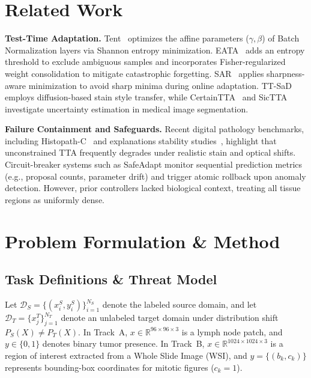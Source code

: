 \documentclass[conference]{IEEEtran}
\begin{document}
\section{Related Work}
\textbf{Test-Time Adaptation.} Tent~\cite{wang2021tent} optimizes the affine parameters ($\gamma, \beta$) of Batch Normalization layers via Shannon entropy minimization. EATA~\cite{niu2022eata} adds an entropy threshold to exclude ambiguous samples and incorporates Fisher-regularized weight consolidation to mitigate catastrophic forgetting. SAR~\cite{niu2023sar} applies sharpness-aware minimization to avoid sharp minima during online adaptation. TT-SaD~\cite{ttsad2024} employs diffusion-based stain style transfer, while CertainTTA~\cite{certaintta2025} and SicTTA~\cite{sictta2026} investigate uncertainty estimation in medical image segmentation.

\textbf{Failure Containment and Safeguards.} Recent digital pathology benchmarks, including Histopath-C~\cite{histopathc2026} and explanations stability studies~\cite{bahumanya2026explanationstability}, highlight that unconstrained TTA frequently degrades under realistic stain and optical shifts. Circuit-breaker systems such as SafeAdapt monitor sequential prediction metrics (e.g., proposal counts, parameter drift) and trigger atomic rollback upon anomaly detection. However, prior controllers lacked biological context, treating all tissue regions as uniformly dense.

\section{Problem Formulation \& Method}

\subsection{Task Definitions \& Threat Model}
Let $\mathcal{D}_S = \{(x_i^S, y_i^S)\}_{i=1}^{N_S}$ denote the labeled source domain, and let $\mathcal{D}_T = \{x_j^T\}_{j=1}^{N_T}$ denote an unlabeled target domain under distribution shift $P_S(X) \ne P_T(X)$.
In Track~A, $x \in \mathbb{R}^{96 \times 96 \times 3}$ is a lymph node patch, and $y \in \{0, 1\}$ denotes binary tumor presence.
In Track~B, $x \in \mathbb{R}^{1024 \times 1024 \times 3}$ is a region of interest extracted from a Whole Slide Image (WSI), and $y = \{(b_k, c_k)\}$ represents bounding-box coordinates for mitotic figures ($c_k = 1$).
\end{document}
